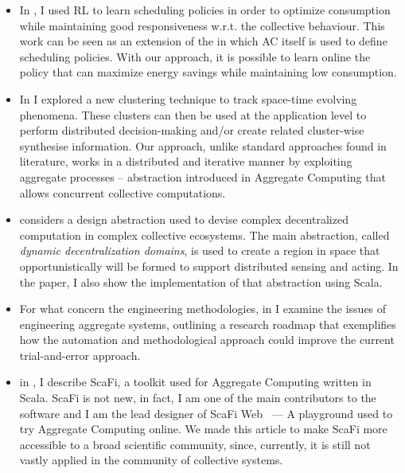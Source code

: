 \documentclass[11pt]{article}
\begin{document}
\begin{itemize}
\item In \textit{}, 
 I used RL to learn scheduling policies 
 in order to optimize consumption 
 while maintaining good responsiveness w.r.t. the collective behaviour.  
This work can be seen as an extension of the \textit{} 
 in which AC itself is used to define scheduling policies. 
With our approach, it is possible 
 to learn online the policy that can 
 maximize energy savings while maintaining low consumption.

%
\item In \textit{} 
 I explored a new clustering technique to track space-time evolving phenomena. 
% 
These clusters can then be used at the application level to perform 
 distributed decision-making and/or create related cluster-wise synthesise information.
Our approach, unlike standard approaches found in literature, 
 works in a distributed and iterative manner by exploiting 
 aggregate processes -- abstraction introduced in Aggregate Computing 
 that allows concurrent collective computations.

\item \textit{} considers a design abstraction used to
 devise complex decentralized computation in complex collective ecosystems.
%
The main abstraction, called \textit{dynamic decentralization domains}, is used to
 create a region in space that opportunistically will be formed to support distributed 
 sensing and acting.
%
In the paper, I also show the implementation of that abstraction using Scala.

\item For what concern the engineering methodologies, in \textit{}
 I examine the issues of engineering aggregate systems, outlining a research roadmap that exemplifies
 how the automation and methodological approach could improve the current
 trial-and-error approach.
%
\item in \textit{}, I describe ScaFi, 
 a toolkit used for Aggregate Computing written in Scala.
ScaFi is not new, in fact, I am one of the main contributors to the software and I am the lead designer of
 ScaFi Web~\cite{aguzzi2021scafi} --- A playground used to try Aggregate Computing online.
We made this article to make ScaFi more accessible to a broad scientific community, 
 since, currently, it is still not vastly applied in the community of collective systems.
\end{itemize}
\end{document}
